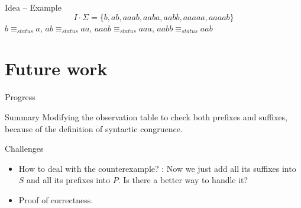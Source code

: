 \documentclass{beamer}
\begin{document}
\begin{frame}{Idea -- Example}
        \centering
    $$
        I\cdot \Sigma = \{b,ab,aaab,aaba,aabb,aaaaa,aaaab\}
    $$
    $b \equiv_{status} a$, $ab \equiv_{status} aa$, $aaab\equiv_{status} aaa$, $aabb \equiv_{status} aab$
\end{frame}

\section{Future work}
\begin{frame}{Progress}

\begin{block}{Summary}
    Modifying the observation table to check both prefixes and suffixes, because of the definition of syntactic congruence.
\end{block}

\begin{block}{Challenges}
    \begin{itemize}
        \item How to deal with the counterexample? : Now we just add all its suffixes into $S$ and all its prefixes into $P$. Is there a better way to handle it?
        \item Proof of correctness.
    \end{itemize}
\end{block}

\end{frame}
\end{document}
